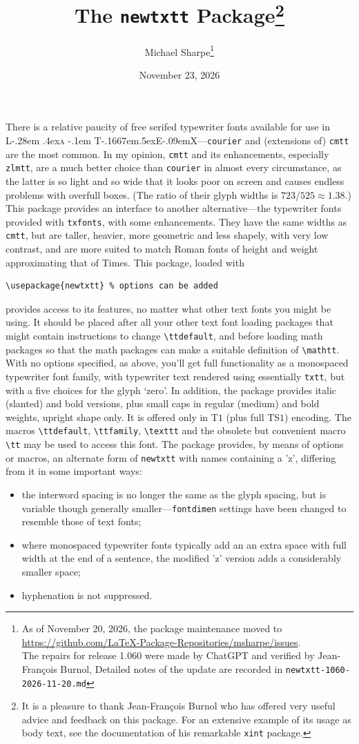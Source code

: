 \documentclass[11pt]{article}
\title{The \texttt{newtxtt} Package\thanks{It is a pleasure to thank Jean-Fran\c{c}ois Burnol who has offered very useful advice and feedback on this package. For an extensive example of its usage as body text, see  the documentation of his remarkable {\tt xint} package.}
}
\author{Michael Sharpe\thanks{As of November 20, 2026, the package
maintenance moved to\\\url{https://github.com/LaTeX-Package-Repositories/msharpe/issues}.\\
The repairs for release 1.060 were made by ChatGPT and verified by Jean-Fran\c{c}ois Burnol,
Detailed notes of the update are recorded in \texttt{newtxtt-1060-2026-11-20.md}}%
}
\date{November 23, 2026}  %
\makeatletter
\def\TeX{T\kern-.1667em\lower.5ex\hbox{E}\kern-.09emX\@}
\DeclareRobustCommand{\LaTeX}{L\kern-.28em%
\raise.4ex\hbox{\textsc{a}}%
        \kern-.1em%
        \TeX}
\makeatother
\begin{document}
\maketitle
There is a relative paucity of free serifed typewriter fonts available for use  in \LaTeX---{\tt courier}
 and (extensions of) {\tt cmtt} are the most common.  In my opinion, {\tt cmtt} and its enhancements, especially {\tt zlmtt}, are a much better choice than {\tt courier} in almost every circumstance, as the latter is so light and so wide that it looks poor on screen and causes endless problems with overfull boxes. (The ratio of their glyph widths is $723/525\approx1.38$.) This package provides an interface to another alternative---the typewriter fonts provided with {\tt txfonts}, with some enhancements. They have the same widths as {\tt cmtt}, but are taller, heavier, more geometric and less shapely, with  very low contrast, and are more suited to match Roman fonts of height and weight approximating that of Times. This package, loaded with
\begin{verbatim}
\usepackage{newtxtt} % options can be added
\end{verbatim}
provides access to its features, no matter what other text fonts you might be using. It should be placed after all your other text font loading packages that might contain instructions to change \verb|\ttdefault|, and before loading math packages so that the math packages can make a suitable definition of \verb|\mathtt|. With no options specified, as above, you'll get full functionality as a monospaced typewriter font family, with typewriter text rendered using essentially {\tt txtt}, but with a five choices for the glyph  `zero'. In addition, the package  provides italic (slanted) and bold versions, plus small caps in regular (medium) and bold weights, upright shape only. It is offered  only in T$1$ (plus full TS$1$) encoding. The macros \verb|\ttdefault|, \verb|\ttfamily|, \verb|\texttt| and the obsolete but convenient macro \verb|\tt| may be used to access this font. 
 The package provides, by means of options or macros, an alternate form of {\tt newtxtt} with names containing a {\ttz 'z'}, differing from it in some important ways:
 \begin{itemize}
 \item 
 the interword spacing is no longer the same as the glyph spacing, but is variable though generally smaller---{\tt fontdimen} settings have been changed to resemble those of text fonts;
 \item
where monospaced typewriter fonts typically add an an extra space with full width at the end of a sentence, the modified {\ttz 'z'} version adds a considerably smaller space;
 \item
 hyphenation is not suppressed.
 \end{itemize}
\end{document}
